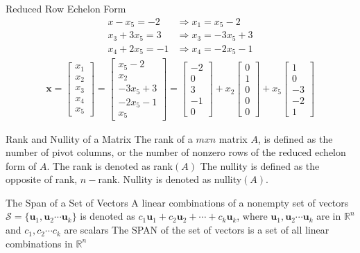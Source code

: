 \begin{example}{Reduced Row Echelon Form}
	\begin{align*}
		x-x_5 =-2   &\Rightarrow x_1=x_5 -2\\
        x_3 + 3x_5 =3 &\Rightarrow x_3=-3x_5+3\\
        x_4 +2x_5 = -1 &\Rightarrow	x_4=-2x_5-1
	\end{align*}
    \begin{align*}
    	\textbf{x}=
        \begin{bmatrix}
       	    x_1\\ x_2 \\ x_3\\ x_4 \\x_5
        \end{bmatrix} =
        \begin{bmatrix}
        	x_5- 2\\ x_2\\ -3x_5 +3\\-2x_5-1\\ x_5 
        \end{bmatrix}=
        \begin{bmatrix}
      	    -2\\ 0 \\ 3 \\-1 \\0
        \end{bmatrix} + x_2
        \begin{bmatrix}
            0 \\ 1 \\ 0 \\ 0 \\ 0 
        \end{bmatrix} + x_5
        \begin{bmatrix}
            1 \\ 0 \\ -3 \\ -2 \\ 1
        \end{bmatrix}
    \end{align*}
\end{example}



\begin{definition}{Rank and Nullity of a Matrix}
The rank of a $m x n$ matrix $A$, is defined as the number of pivot columns, or the number of nonzero rows of the reduced echelon form of $A$. The rank is denoted as rank$(A)$
The nullity is defined as the opposite of rank, $n - $rank. Nullity is denoted as nullity$(A)$.
\cite[47]{LiAl}
\end{definition}

\begin{definition} {The Span of a Set of Vectors}
A linear combinations of a nonempty set of vectors $\mathcal{S} = \{ \textbf{u}_1,\textbf{u}_2 \cdots \textbf{u}_k\}$ is denoted as $c_1 \textbf{u}_1 + c_2\textbf{u}_2+ \cdots+ c_k\textbf{u}_k$, where $\textbf{u}_1,\textbf{u}_2 \cdots \textbf{u}_k$ are in $\mathbb{R}^n$ and $c_1, c_2 \cdots c_k$ are scalars
The SPAN of the set of vectors is a set of all linear combinations in $\mathbb{R}^n$
\cite[66]{LiAl}
\end{definition}